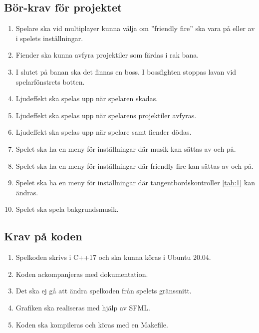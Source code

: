 \documentclass{TDP005mall}
\begin{document}
\subsection{Bör-krav för projektet}
\begin{enumerate}
\item Spelare ska vid multiplayer kunna välja om ''friendly fire'' ska vara på eller av i spelets inställningar. 
\item Fiender ska kunna avfyra projektiler som färdas i rak bana.
\item I slutet på banan ska det finnas en boss. I bossfighten stoppas lavan vid spelarfönstrets botten.
\item Ljudeffekt ska spelas upp när spelaren skadas.
\item Ljudeffekt ska spelas upp när spelarens projektiler avfyras.
\item Ljudeffekt ska spelas upp när spelare samt fiender dödas.
\item Spelet ska ha en meny för inställningar där musik kan sättas av och på.
\item Spelet ska ha en meny för inställningar där friendly-fire kan sättas av och på.
\item Spelet ska ha en meny för inställningar där tangentbordskontroller \ref{tab:1} kan ändras.
\item Spelet ska spela bakgrundsmusik.
\end{enumerate}


\subsection{Krav på koden} %
\begin{enumerate}
\item    Spelkoden skrivs i C++17 och ska kunna köras i Ubuntu 20.04.
\item    Koden ackompanjeras med dokumentation.
\item    Det ska ej gå att ändra spelkoden från spelets gränssnitt.
\item    Grafiken ska realiseras med hjälp av SFML.
\item    Koden ska kompileras och köras med en Makefile.
\end{enumerate}

\newpage
\printbibliography
\end{document}
